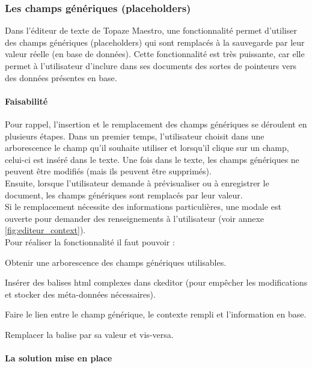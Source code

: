 \subsubsection{Les champs génériques (placeholders)}
Dans l'éditeur de texte de Topaze Maestro, une fonctionnalité permet d'utiliser des champs génériques (placeholders) qui sont remplacés à la sauvegarde par leur valeur réelle (en base de données). Cette fonctionnalité est très puissante, car elle permet à l'utilisateur d'inclure dans ses documents des sortes de pointeurs vers des données présentes en base. 

\paragraph*{Faisabilité\\}
Pour rappel, l'insertion et le remplacement des champs génériques se déroulent en plusieurs étapes. Dans un premier temps, l'utilisateur choisit dans une arborescence le champ qu'il souhaite utiliser et lorsqu'il clique sur un champ, celui-ci est inséré dans le texte.
Une fois dans le texte, les champs génériques ne peuvent être modifiés (mais ils peuvent être supprimés).\\
Ensuite, lorsque l'utilisateur demande à prévisualiser ou à enregistrer le document, les champs génériques sont remplacés par leur valeur.\\
Si le remplacement nécessite des informations particulières, une modale est ouverte pour demander des renseignements à l'utilisateur (voir annexe \ref{fig:editeur_context}).\\
 
Pour réaliser la fonctionnalité il faut pouvoir : %
\begin{sitemize}
\item Obtenir une arborescence des champs génériques utilisables.
\item Insérer des balises html complexes dans ckeditor (pour empêcher les modifications et stocker des méta-données nécessaires).
\item Faire le lien entre le champ générique, le contexte rempli et l'information en base.
\item Remplacer la balise par sa valeur et vis-versa.
\end{sitemize}

\paragraph*{La solution mise en place}

